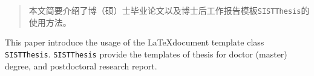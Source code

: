 \begin{abstract}
本文简要介绍了博（硕）士毕业论文以及博士后工作报告模板\verb|SISTThesis|的使用方法。

\end{abstract}

\begin{englishabstract}
This paper introduce the usage of the \LaTeX document template class \verb|SISTThesis|.  \verb|SISTThesis| provide the templates of thesis for doctor (master) degree, and postdoctoral research report.


\end{englishabstract}